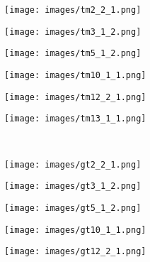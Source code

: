 \documentclass[journal]{IEEEtran}
\begin{document}
\begin{figure*}
    \centering
    \begin{subfigure}[b]{0.16\textwidth}
        \texttt{[image: images/tm2\_2\_1.png]}
    \end{subfigure}
    \hfill
    \begin{subfigure}[b]{0.16\textwidth}
        \texttt{[image: images/tm3\_1\_2.png]}
    \end{subfigure}
    \hfill
    \begin{subfigure}[b]{0.16\textwidth}
        \texttt{[image: images/tm5\_1\_2.png]}
    \end{subfigure}
    \hfill
    \begin{subfigure}[b]{0.16\textwidth}
        \texttt{[image: images/tm10\_1\_1.png]}
    \end{subfigure}
    \hfill
    \begin{subfigure}[b]{0.16\textwidth}
        \texttt{[image: images/tm12\_2\_1.png]}
    \end{subfigure}
    \hfill
    \begin{subfigure}[b]{0.16\textwidth}
        \texttt{[image: images/tm13\_1\_1.png]}
    \end{subfigure}
    \\
    \vspace{1mm}
    \begin{subfigure}[b]{0.16\textwidth}
        \texttt{[image: images/gt2\_2\_1.png]}
    \end{subfigure}
    \hfill
    \begin{subfigure}[b]{0.16\textwidth}
        \texttt{[image: images/gt3\_1\_2.png]}
    \end{subfigure}
    \hfill
    \begin{subfigure}[b]{0.16\textwidth}
        \texttt{[image: images/gt5\_1\_2.png]}
    \end{subfigure}
    \hfill
    \begin{subfigure}[b]{0.16\textwidth}
        \texttt{[image: images/gt10\_1\_1.png]}
    \end{subfigure}
    \hfill
    \begin{subfigure}[b]{0.16\textwidth}
        \texttt{[image: images/gt12\_2\_1.png]}
    \end{subfigure}
    \hfill
    \begin{subfigure}[b]{0.16\textwidth}

\end{subfigure}
\end{figure*}
\end{document}
